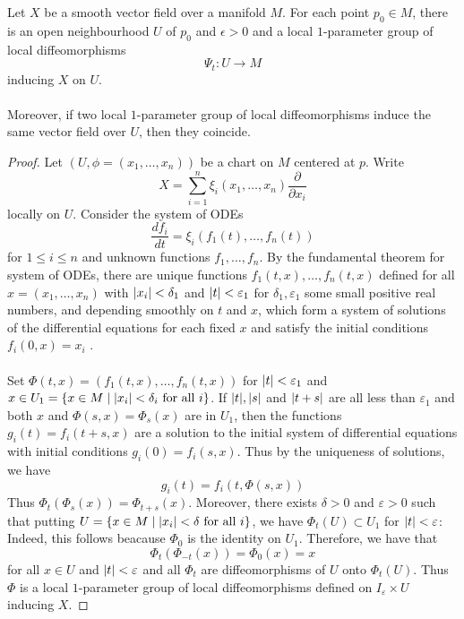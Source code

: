 \documentclass[a4paper]{article}
\begin{document}
\begin{prp}{}{} Let $X$ be a smooth vector field over a manifold $M$. For each point $p_0\in M$, there is an open neighbourhood $U$ of $p_0$ and $\epsilon>0$ and a local $1$-parameter group of local diffeomorphisms $$\Psi_t:U\to M$$ inducing $X$ on $U$. \\~\\
Moreover, if two local $1$-parameter group of local diffeomorphisms induce the same vector field over $U$, then they coincide. \tcbline
\begin{proof}
Let $(U,\phi=(x_1,\dots,x_n))$ be a chart on $M$ centered at $p$. Write $$X=\sum_{i=1}^n\xi_i(x_1,\dots,x_n)\frac{\partial}{\partial x_i}$$ locally on $U$. Consider the system of ODEs $$\frac{df_i}{dt}=\xi_i(f_1(t),\dots,f_n(t))$$ for $1\leq i\leq n$ and unknown functions $f_1,\dots,f_n$. By the fundamental theorem for system of ODEs, there are unique functions $f_1(t,x),\dots,f_n(t,x)$ defined for all $x=(x_1,\dots,x_n)$ with $\abs{x_i}<\delta_1$ and $\abs{t}<\varepsilon_1$ for $\delta_1,\varepsilon_1$ some small positive real numbers, and depending smoothly on $t$ and $x$, which form a system of solutions of the differential equations for each fixed $x$ and satisfy the initial conditions $f_i(0,x)=x_i$ . \\~\\

Set $\Phi(t,x)=(f_1(t,x),\dots,f_n(t,x))$ for $\abs{t}<\varepsilon_1$ and $x\in U_1=\{x\in M\;|\;\abs{x_i}<\delta_i\text{ for all } i\}$. If $\abs{t},\abs{s}$ and $\abs{t+s}$ are all less than $\varepsilon_1$ and both $x$ and $\Phi(s,x)=\Phi_s(x)$ are in $U_1$, then the functions $g_i(t)=f_i(t+s,x)$ are a solution to the initial system of differential equations with initial conditions $g_i(0)=f_i(s,x)$. Thus by the uniqueness of solutions, we have $$g_i(t)=f_i(t,\Phi(s,x))$$ Thus $\Phi_t(\Phi_s(x))=\Phi_{t+s}(x)$. Moreover, there exists $\delta>0$ and $\varepsilon>0$ such that putting $U=\{x\in M\;|\;\abs{x_i}<\delta\text{ for all } i\}$, we have $\Phi_t(U)\subset U_1$ for $\abs{t}<\varepsilon$: Indeed, this follows beacause $\Phi_0$ is the identity on $U_1$. Therefore, we have that $$\Phi_t(\Phi_{-t}(x))=\Phi_0(x)=x$$ for all $x\in U$ and $\abs{t}<\varepsilon$ and all $\Phi_t$ are diffeomorphisms of $U$ onto $\Phi_t(U)$. Thus $\Phi$ is a local $1$-parameter group of local diffeomorphisms defined on $I_\varepsilon\times U$ inducing $X$. 
\end{proof}
\end{prp}
\end{document}
